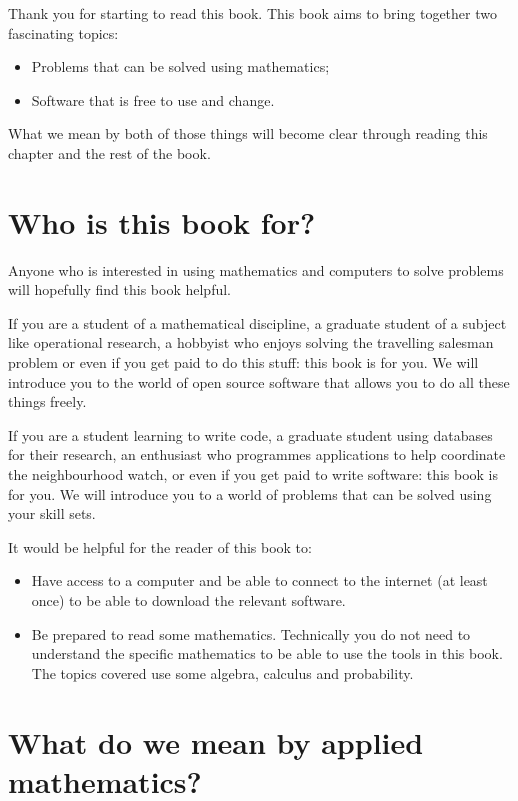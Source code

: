 Thank you for starting to read this book. This book aims to bring
together two fascinating topics:

\begin{itemize}
\tightlist
\item
  Problems that can be solved using mathematics;
\item
  Software that is free to use and change.
\end{itemize}

What we mean by both of those things will become clear through reading
this chapter and the rest of the book.

\section{Who is this book for?}\label{sec:who-is-this-book-for}

Anyone who is interested in using mathematics and computers to solve
problems will hopefully find this book helpful.


If you are a student of a mathematical discipline, a graduate student of
a subject like operational research, a hobbyist who enjoys solving the
travelling salesman problem or even if you get paid to do this stuff:
this book is for you. We will introduce you to the world of open source
software that allows you to do all these things freely.

If you are a student learning to write code, a graduate student using
databases for their research, an enthusiast who programmes applications
to help coordinate the neighbourhood watch, or even if you get paid to
write software: this book is for you. We will introduce you to a world
of problems that can be solved using your skill sets.

It would be helpful for the reader of this book to:

\begin{itemize}
\item
  Have access to a computer and be able to connect to the internet (at
  least once) to be able to download the relevant software.
\item
  Be prepared to read some mathematics. Technically you do not need to
  understand the specific mathematics to be able to use the tools in this book.
  The topics covered use some algebra, calculus and probability.
\end{itemize}

\section{What do we mean by applied
mathematics?}\label{sec:what-do-we-mean-by-applied-mathematics}

